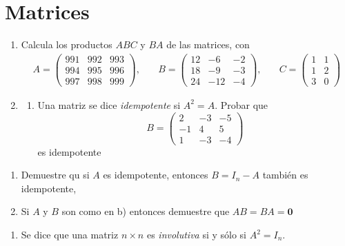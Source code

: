 \documentclass[
]{article}
\providecommand{\tightlist}{%
  \setlength{\itemsep}{0pt}\setlength{\parskip}{0pt}}
\begin{document}
\hypertarget{matrices}{%
\section{Matrices}\label{matrices}}

\begin{enumerate}
\def\labelenumi{\arabic{enumi}.}
\item
  Calcula los productos \(ABC\) y \(BA\) de las matrices, con \[
  \begin{array}{lcr}
  A=\begin{pmatrix}
   991 & 992 & 993 \\
   994 & 995 & 996 \\
   997 & 998 & 999
    \end{pmatrix}, \quad &
  B = \begin{pmatrix}
   12 & -6 & -2 \\
   18 & -9 & -3 \\
   24 &-12 & -4
   \end{pmatrix}, \quad &
  C = \begin{pmatrix}
   1 & 1  \\
   1 & 2  \\
   3 & 0 
   \end{pmatrix}
  \end{array}
  \]
\item
  \begin{enumerate}
  \def\labelenumii{\alph{enumii})}
  \tightlist
  \item
    Una matriz se dice \emph{idempotente} si \(A^2 = A\). Probar que \[
    B= \begin{pmatrix}
     2 & -3 & -5 \\
    -1 &  4 & 5  \\
     1 & -3 &- 4
    \end{pmatrix}
    \] es idempotente
  \end{enumerate}
\end{enumerate}

\begin{enumerate}
\def\labelenumi{\alph{enumi})}
\setcounter{enumi}{1}
\tightlist
\item
  Demuestre qu si \(A\) es idempotente, entonces \(B=I_n-A\) también es
  idempotente,
\item
  Si \(A\) y \(B\) son como en b) entonces demuestre que
  \(AB= BA = \mathbf{0}\)
\end{enumerate}

\begin{enumerate}
\def\labelenumi{\arabic{enumi}.}
\setcounter{enumi}{1}
\tightlist
\item
  Se dice que una matriz \(n\times n\) es \emph{involutiva} si y sólo si
  \(A^2 = I_n\).
\end{enumerate}
\end{document}
